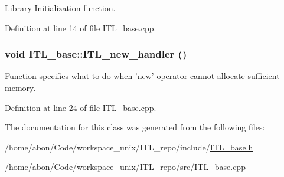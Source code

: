 Library Initialization function. 



Definition at line 14 of file ITL\_\-base.cpp.

\hypertarget{classITL__base_a94be5c706baec9a4c1eb0bc715acdf7e}{
\subsubsection[{ITL\_\-new\_\-handler}]{\setlength{\rightskip}{0pt plus 5cm}void ITL\_\-base::ITL\_\-new\_\-handler ()}}
\label{classITL__base_a94be5c706baec9a4c1eb0bc715acdf7e}


Function specifies what to do when 'new' operator cannot allocate sufficient memory. 



Definition at line 24 of file ITL\_\-base.cpp.



The documentation for this class was generated from the following files:\begin{DoxyCompactItemize}
\item 
/home/abon/Code/workspace\_\-unix/ITL\_\-repo/include/\hyperlink{ITL__base_8h}{ITL\_\-base.h}\item 
/home/abon/Code/workspace\_\-unix/ITL\_\-repo/src/\hyperlink{ITL__base_8cpp}{ITL\_\-base.cpp}\end{DoxyCompactItemize}

